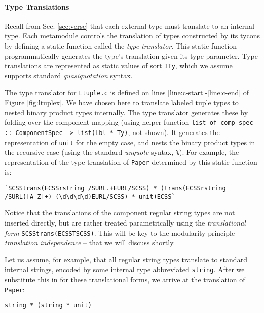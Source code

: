 \paragraph{Type Translations} Recall from Sec. \ref{sec:verse} that each external type must translate to an internal type. Each metamodule controls the translation of types constructed by its tycons by defining a static function called the \emph{type translator}. This static function programmatically generates the type's translation given its type parameter. Type translations are represented as static values of sort \lstinline{ITy}, which we assume supports standard \emph{quasiquotation} syntax. 

The  type translator for \lstinline{Ltuple.c} is defined on lines \ref{line:c-start}-\ref{line:c-end} of Figure \ref{fig:ltuplex}. We have chosen here to translate labeled tuple types to nested binary product types internally. The type translator generates these by folding over the component mapping (using helper function \lstinline{list_of_comp_spec :: ComponentSpec -> list(Lbl * Ty)}, not shown). It generates the representation of \lstinline{unit} for the empty case, and nests the binary product types in the recursive case (using the standard \emph{unquote} syntax, \lstinline{%}). 
For example, the representation of the type translation of \lstinline{Paper} determined by this static function is:
\begin{lstlisting}[numbers=none]
`SCSStrans(ECSSrstring /SURL.+EURL/SCSS) * (trans(ECSSrstring /SURL([A-Z]+) (\d\d\d\d)EURL/SCSS) * unit)ECSS`
\end{lstlisting}
Notice that the translations of the component regular string types are not inserted directly, but are rather treated {parametrically} using the \emph{translational form} \lstinline{SCSStrans(ECSSTSCSS)}. This will be key to the modularity principle -- \emph{translation independence} -- that we will discuss shortly.%

Let us assume, for example, that all regular string types translate to standard internal strings, encoded by some internal type abbreviated \lstinline{string}. After we substitute this in for these translational forms, we arrive at the translation of \lstinline{Paper}:
\begin{lstlisting}[numbers=none]
string * (string * unit)
\end{lstlisting}

